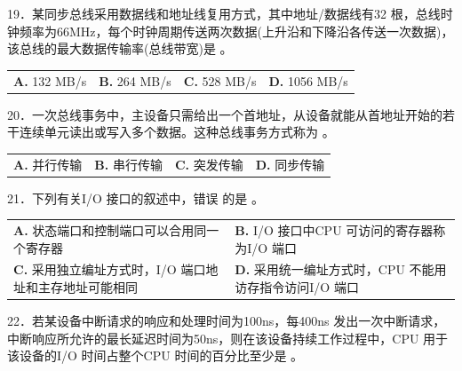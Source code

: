 \documentclass[UTF8,11pt]{ctexart}
\begin{document}
19．某同步总线采用数据线和地址线复用方式，其中地址/数据线有32 根，总线时钟频率为66MHz，每个时钟周期传送两次数据(上升沿和下降沿各传送一次数据)，该总线的最大数据传输率(总线带宽)是 。


\begin{center}\begin{tabular}{>{\raggedright\arraybackslash}p{\dimexpr(\linewidth-8\tabcolsep)/4\relax}>{\raggedright\arraybackslash}p{\dimexpr(\linewidth-8\tabcolsep)/4\relax}>{\raggedright\arraybackslash}p{\dimexpr(\linewidth-8\tabcolsep)/4\relax}>{\raggedright\arraybackslash}p{\dimexpr(\linewidth-8\tabcolsep)/4\relax}}
\textbf{A.} 132 MB/s & \textbf{B.} 264 MB/s & \textbf{C.} 528 MB/s & \textbf{D.} 1056 MB/s\\[.35em]\end{tabular}\end{center}

20．一次总线事务中，主设备只需给出一个首地址，从设备就能从首地址开始的若干连续单元读出或写入多个数据。这种总线事务方式称为 。


\begin{center}\begin{tabular}{>{\raggedright\arraybackslash}p{\dimexpr(\linewidth-8\tabcolsep)/4\relax}>{\raggedright\arraybackslash}p{\dimexpr(\linewidth-8\tabcolsep)/4\relax}>{\raggedright\arraybackslash}p{\dimexpr(\linewidth-8\tabcolsep)/4\relax}>{\raggedright\arraybackslash}p{\dimexpr(\linewidth-8\tabcolsep)/4\relax}}
\textbf{A.} 并行传输 & \textbf{B.} 串行传输 & \textbf{C.} 突发传输 & \textbf{D.} 同步传输\\[.35em]\end{tabular}\end{center}

21．下列有关I/O 接口的叙述中，错误 的是 。


\begin{center}\begin{tabular}{>{\raggedright\arraybackslash}p{\dimexpr(\linewidth-4\tabcolsep)/2\relax}>{\raggedright\arraybackslash}p{\dimexpr(\linewidth-4\tabcolsep)/2\relax}}
\textbf{A.} 状态端口和控制端口可以合用同一个寄存器 & \textbf{B.} I/O 接口中CPU 可访问的寄存器称为I/O 端口\\[.35em]
\textbf{C.} 采用独立编址方式时，I/O 端口地址和主存地址可能相同 & \textbf{D.} 采用统一编址方式时，CPU 不能用访存指令访问I/O 端口\\[.35em]\end{tabular}\end{center}

22．若某设备中断请求的响应和处理时间为100ns，每400ns 发出一次中断请求，中断响应所允许的最长延迟时间为50ns，则在该设备持续工作过程中，CPU 用于该设备的I/O 时间占整个CPU 时间的百分比至少是 。
\end{document}
